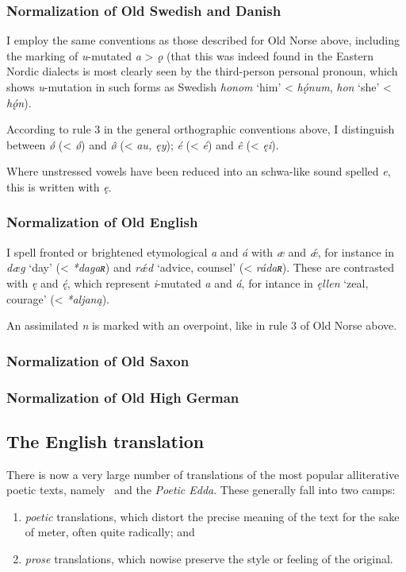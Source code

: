     \subsubsection{Normalization of Old Swedish and Danish}
    I employ the same conventions as those described for Old Norse above, including the marking of \emph{u}-mutated \emph{a} > \emph{ǫ} (that this was indeed found in the Eastern Nordic dialects is most clearly seen by the third-person personal pronoun, which shows \emph{u}-mutation in such forms as Swedish \emph{honom} ‘him’ < \emph{hǫ́num}, \emph{hon} ‘she’ < \emph{hǫ́n}).

    According to rule 3 in the general orthographic conventions above, I distinguish between \emph{ǿ} (< \emph{ǿ}) and \emph{ø̂} (< \emph{au, ęy}); \emph{é} (< \emph{é}) and \emph{ê} (< \emph{ęi}).

    Where unstressed vowels have been reduced into an schwa-like sound spelled \emph{e}, this is written with \emph{ę}.

    \subsubsection{Normalization of Old English}
    I spell fronted or brightened etymological \emph{a} and \emph{á} with \emph{æ} and \emph{ǽ}, for instance in \emph{dæg} ‘day’ (< \emph{*dagaʀ}) and \emph{rǽd} ‘advice, counsel’ (< \emph{rádaʀ}).  These are contrasted with \emph{ę} and \emph{ę́}, which represent \emph{i}-mutated \emph{a} and \emph{á}, for intance in \emph{ęllen} ‘zeal, courage’ (< \emph{*aljaną}).

    An assimilated \emph{n} is marked with an overpoint, like in rule 3 of Old Norse above.

    \subsubsection{Normalization of Old Saxon}

    \subsubsection{Normalization of Old High German}

  \subsection{The English translation}

    There is now a very large number of translations of the most popular alliterative poetic texts, namely \Beowulf\ and the \emph{Poetic Edda}.  These generally fall into two camps:
    \begin{enumerate}
      \item \emph{poetic} translations, which distort the precise meaning of the text for the sake of meter, often quite radically; and
      \item \emph{prose} translations, which nowise preserve the style or feeling of the original.
    \end{enumerate}

